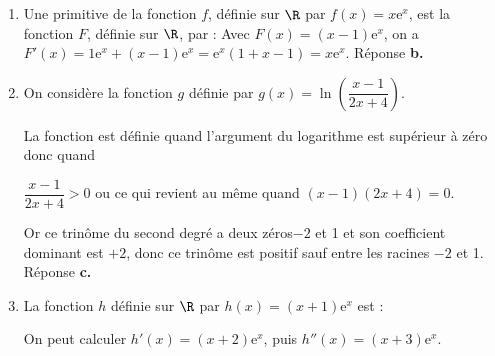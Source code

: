 \begin{enumerate}
\item Une primitive de la fonction $f$, définie sur $\R$ par $f(x) =x\text{e}^x$, est la fonction $F$, définie sur $\R$, par :
Avec $F(x) = (x - 1)\text{e}^x$, on a $F'(x) = 1\text{e}^x + (x - 1)\text{e}^x = \text{e}^x(1 + x - 1) = x\text{e}^x$. Réponse \textbf{b.}

\item On considère la fonction $g$ définie par $g(x) = \ln \left(\dfrac{x - 1}{2x+ 4}\right).$


La fonction est définie quand l'argument du logarithme est supérieur à zéro donc quand 

$\dfrac{x - 1}{2x+ 4} > 0$ ou ce qui revient au même quand $(x - 1)(2x + 4) = 0$.

Or ce trinôme du second degré a deux zéros$- 2$ et 1 et son coefficient dominant est $+ 2$, donc ce trinôme est positif sauf entre les racines $- 2$ et 1. Réponse \textbf{c.}
\item  La fonction $h$ définie sur $\R$ par $h(x)= (x + 1)\text{e}^{x}$ est :

On peut calculer $h'(x) = (x + 2)\text{e}^x$, puis $h''(x) = (x + 3)\text{e}^x$.


\end{enumerate}
